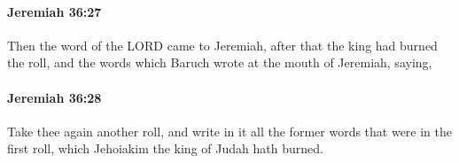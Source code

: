 		\paragraph{Jeremiah 36:27} %
			\label{JEREMIAH-36-27}

			Then the word of the LORD came to Jeremiah, after that the king had burned the roll, and the words which Baruch wrote at the mouth of Jeremiah, saying,


		\paragraph{Jeremiah 36:28} %
			\label{JEREMIAH-36-28}

			Take thee again another roll, and write in it all the former words that were in the first roll, which Jehoiakim the king of Judah hath burned.


